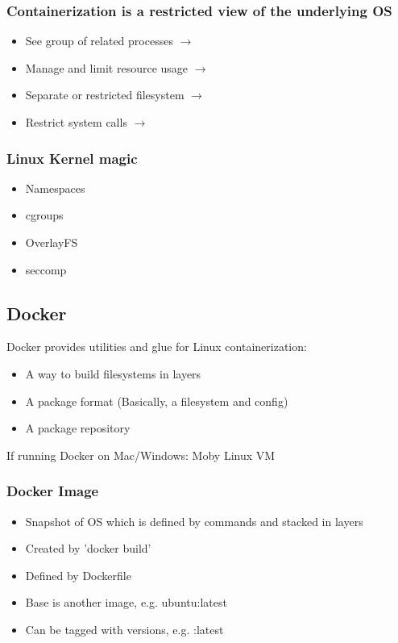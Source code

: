 \documentclass{article}
\begin{document}
\begin{multicols}{2}
    \subsubsection*{Containerization is a restricted view of the underlying OS }
        \begin{itemize}
            \item See group of related processes $\rightarrow$
            \item Manage and limit resource usage $\rightarrow$
            \item Separate or restricted filesystem $\rightarrow$
            \item Restrict system calls $\rightarrow$
        \end{itemize}
    \subsubsection*{Linux Kernel magic}
        \begin{itemize}
            \item Namespaces
            \item cgroups
            \item OverlayFS
            \item seccomp
        \end{itemize}
\end{multicols}

\subsection{Docker}

Docker provides utilities and glue for Linux containerization:
\begin{itemize}
    \item A way to build filesystems in layers
    \item A package format (Basically, a filesystem and config)
    \item A package repository
\end{itemize}

If running Docker on Mac/Windows: Moby Linux VM

\subsubsection{Docker Image}
\begin{itemize}
    \item Snapshot of OS which is defined by commands and stacked in layers 
    \item Created by 'docker build' 
    \item Defined by Dockerfile 
    \item Base is another image, e.g. ubuntu:latest 
    \item Can be tagged with versions, e.g. :latest 
\end{itemize}
\end{document}
